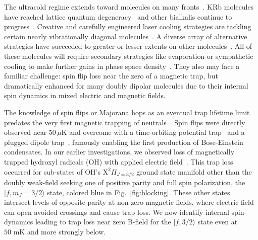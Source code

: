 \documentclass[%
 reprint,
 amsmath,amssymb,
 aps,
prl,
]{revtex4-1}
\begin{document}
\maketitle


%
%
The ultracold regime extends toward molecules on many fronts~\cite{Carr2009}. KRb molecules have reached lattice quantum degeneracy~\cite{Moses2015} and other bialkalis continue to progress~\cite{Takekoshi2014, Park2015,Guo2016,Liu2017}. Creative and carefully engineered laser cooling strategies are tackling certain nearly vibrationally diagonal molecules~\cite{Stuhl2008,Shuman2010,Hummon2013, Barry2014, Zhelyazkova2014, Steinecker2016, Hemmerling2016}. A diverse array of alternative strategies have succeeded to greater or lesser extents on other molecules~\cite{Doyle1998, Bethlem1999, Bochinski2003, Narevicius2008, Wiederkehr2012, Prehn2016,Liu2017a}. All of these molecules will require secondary strategies like evaporation or sympathetic cooling to make further gains in phase space density~\cite{Parazzoli2011, Stuhl2012evap, Quemener2016}. They also may face a familiar challenge: spin flip loss near the zero of a magnetic trap, but dramatically enhanced for many doubly dipolar molecules due to their internal spin dynamics in mixed electric and magnetic fields. 

The knowledge of spin flips or Majorana hops as an eventual trap lifetime limit predates the very first magnetic trapping of neutrals~\cite{Migdall1985}. Spin flips were directly observed near $50\,\mu\text{K}$ and overcome with a time-orbiting potential trap~\cite{Petrich1995} and a plugged dipole trap~\cite{Davis1995}, famously enabling the first production of Bose-Einstein condensates. In our earlier investigations, we observed loss of magnetically trapped hydroxyl radicals (OH) with applied electric field~\cite{Stuhl2012uwave}. This trap loss occurred for sub-states of OH's $\mathrm{X}^2\Pi_{J=3/2}$ ground state manifold other than the doubly weak-field seeking one of positive parity and full spin polarization, the $|f,m_J=3/2\rangle$ state, colored blue in Fig.~\ref{fig:blocking}. These other states intersect levels of opposite parity at non-zero magnetic fields, where electric field can open avoided crossings and cause trap loss. We now identify internal spin-dynamics leading to trap loss near zero B-field for the $|f,3/2\rangle$ state even at $50\text{ mK}$ and more strongly below. 
\end{document}
